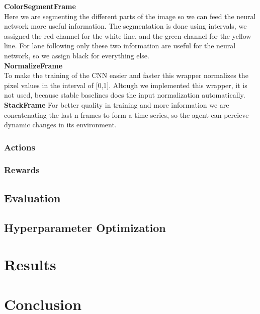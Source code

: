 \documentclass{article}
\begin{document}
\textbullet  \textbf{ColorSegmentFrame}\\
Here we are segmenting the different parts of the image so we can feed the neural network more useful information. The segmentation is done using intervals, we assigned the red channel for the white line, and the green channel for the yellow line. For lane following only these two information are useful for the neural network, so we assign black for everything else.\\
\textbullet  \textbf{NormalizeFrame}\\
To make the training of the CNN easier and faster this wrapper normalizes the pixel values in the interval of [0,1]. Altough we implemented this wrapper, it is not used, because stable baselines does the input normalization automatically.\\
\textbullet  \textbf{StackFrame}
For better quality in training and more information we are concatenating the last n frames to form a time series, so the agent can percieve dynamic changes in its environment.\\

\subsubsection{\normalsize{Actions}}

\subsubsection{\normalsize{Rewards}}

\subsection{\normalsize{Evaluation}}

\subsection{\normalsize{Hyperparameter Optimization}}

\section{\large{Results}}

\section{\large{Conclusion}}



%

%
\end{document}
